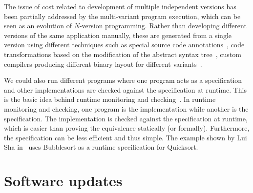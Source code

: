 The issue of cost related to development of multiple independent versions has
been partially addressed by the multi-variant program execution, which can be seen
as an evolution of $N$-version programming. Rather than developing different versions
of the same application manually, these are generated from a single version
using different techniques such as special source code
annotations~\cite{onlinevalidation,trachsel10}, code transformations based on
the modification of the abstract syntax tree~\cite{schulte14,sosie:issta14},
custom compilers producing different binary layout for different
variants~\cite{orchestra09,unibus:nspw10}. %

We could also run different programs where one program acts as a specification
and other implementations are checked against the specification at runtime.
This is the basic idea behind runtime monitoring and
checking~\cite{kim:mac,java-mac01}. In runtime monitoring and checking, one
program is the implementation while another is the specification. The
implementation is checked against the specification at runtime, which is easier
than proving the equivalence statically (or formally).  Furthermore, the
specification can be less efficient and thus simple. The example shown by Lui
Sha in~\cite{lui01} uses Bubblesort as a runtime specification for Quicksort.


\section{Software updates}


